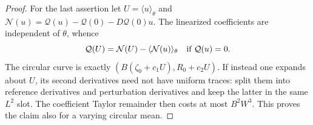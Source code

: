 \begin{proof}
For the last assertion let $U=\langle u\rangle_\theta$ and
$\mathcal N(u)=\mathcal Q(u)-\mathcal Q(0)-D\mathcal Q(0)u$.
The linearized coefficients are independent of $\theta$, whence
\begin{equation}
 \mathcal Q(U)=\mathcal N(U)-\langle\mathcal N(u)\rangle_\theta
 \quad\hbox{if }\mathcal Q(u)=0.
 \label{gauge:averaging}
\end{equation}
The circular curve is exactly $(B(\zeta_0+c_1U),R_0+c_2U)$.
If instead one expands about $U$, its second derivatives need not have
uniform traces: split them into reference derivatives and perturbation
derivatives and keep the latter in the same $L^2$ slot.  The coefficient
Taylor remainder then costs at most $B^2W^3$.  This proves the claim also
for a varying circular mean.
\end{proof}


